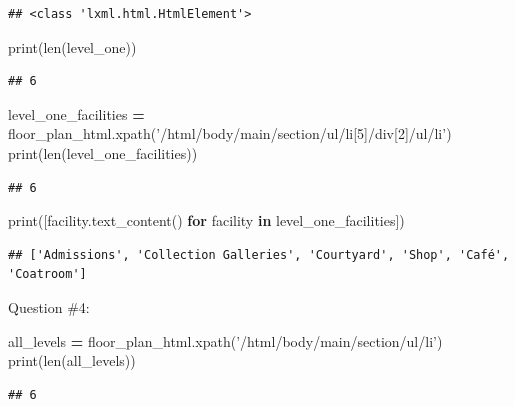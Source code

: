 \documentclass[]{book}
\newenvironment{Shaded}{\begin{snugshade}}{\end{snugshade}}
\newcommand{\BuiltInTok}[1]{#1}
\newcommand{\ControlFlowTok}[1]{\textcolor[rgb]{0.13,0.29,0.53}{\textbf{#1}}}
\newcommand{\KeywordTok}[1]{\textcolor[rgb]{0.13,0.29,0.53}{\textbf{#1}}}
\newcommand{\NormalTok}[1]{#1}
\newcommand{\OperatorTok}[1]{\textcolor[rgb]{0.81,0.36,0.00}{\textbf{#1}}}
\newcommand{\StringTok}[1]{\textcolor[rgb]{0.31,0.60,0.02}{#1}}
\begin{document}
\begin{verbatim}
## <class 'lxml.html.HtmlElement'>
\end{verbatim}

\begin{Shaded}
\begin{Highlighting}[]
\BuiltInTok{print}\NormalTok{(}\BuiltInTok{len}\NormalTok{(level_one))}
\end{Highlighting}
\end{Shaded}

\begin{verbatim}
## 6
\end{verbatim}

\begin{Shaded}
\begin{Highlighting}[]
\NormalTok{level_one_facilities }\OperatorTok{=}\NormalTok{ floor_plan_html.xpath(}\StringTok{'/html/body/main/section/ul/li[5]/div[2]/ul/li'}\NormalTok{)}
\BuiltInTok{print}\NormalTok{(}\BuiltInTok{len}\NormalTok{(level_one_facilities))}
\end{Highlighting}
\end{Shaded}

\begin{verbatim}
## 6
\end{verbatim}

\begin{Shaded}
\begin{Highlighting}[]
\BuiltInTok{print}\NormalTok{([facility.text_content() }\ControlFlowTok{for}\NormalTok{ facility }\KeywordTok{in}\NormalTok{ level_one_facilities])}
\end{Highlighting}
\end{Shaded}

\begin{verbatim}
## ['Admissions', 'Collection Galleries', 'Courtyard', 'Shop', 'Café', 'Coatroom']
\end{verbatim}

Question \#4:

\begin{Shaded}
\begin{Highlighting}[]
\NormalTok{all_levels }\OperatorTok{=}\NormalTok{ floor_plan_html.xpath(}\StringTok{'/html/body/main/section/ul/li'}\NormalTok{)}
\BuiltInTok{print}\NormalTok{(}\BuiltInTok{len}\NormalTok{(all_levels))}
\end{Highlighting}
\end{Shaded}

\begin{verbatim}
## 6
\end{verbatim}
\end{document}
